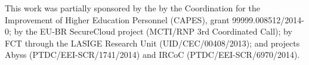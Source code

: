 \documentclass[journal]{IEEEtran}
\begin{document}
This work was partially sponsored by the by the Coordination for the Improvement of Higher Education Personnel (CAPES), grant 99999.008512/2014-0; by the EU-BR SecureCloud project (MCTI/RNP 3rd Coordinated Call); by FCT through the LASIGE Research Unit (UID/CEC/00408/2013); and projects Abyss (PTDC/EEI-SCR/1741/2014) and IRCoC (PTDC/EEI-SCR/6970/2014).

% 
% 
% 
\end{document}
